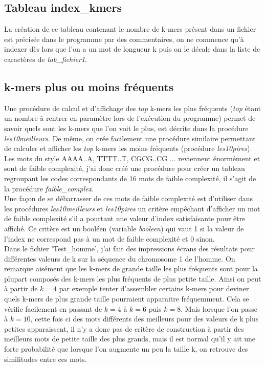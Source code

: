 \documentclass[10pt]{article}
\begin{document}
\subsection{Tableau index\_kmers}


La création de ce tableau contenant le nombre de k-mers présent dans un fichier est précisée dans le programme par des commentaires, on ne commence qu'à indexer dès lors que l'on a un mot de longueur k puis on le décale dans la liste de caractères de \textit{tab\_fichier1}.


\subsection{k-mers plus ou moins fréquents}


Une procédure de calcul et d'affichage des \textit{top} k-mers les plus fréquents (\textit{top} étant un nombre à rentrer en paramètre lors de l'exécution du programme) permet de savoir quels sont les k-mers que l'on voit le plus, est décrite dans la procédure \textit{les10meilleurs}. De même, on crée facilement une procédure similaire permettant de calculer et afficher les \textit{top} k-mers les moins fréquents (procédure \textit{les10pires}). \\

Les mots du style AAAA..A, TTTT..T, CGCG..CG ... reviennent énormément et sont de faible complexité, j'ai donc créé une procédure pour créer un tableau regroupant les codes correspondants de 16 mots de faible complexité, il s'agit de la procédure \textit{faible\_complex}. \\

Une façon de se débarrasser de ces mots de faible complexité est d'utiliser dans les procédures \textit{les10meilleurs} et \textit{les10pires} un critère empêchant d'afficher un mot de faible complexité s'il a pourtant une valeur d'index satisfaisante pour être affiché. Ce critère est un booléen (variable \textit{booleen}) qui vaut 1 si la valeur de l'index ne correspond pas à un mot de faible complexité et 0 sinon. \\

Dans le fichier 'Test\_homme', j'ai fait des impressions écrans des résultats pour différentes valeurs de k sur la séquence du chromosome 1 de l'homme. On remarque aisément que les k-mers de grande taille les plus fréquents sont pour la plupart composés des k-mers les plus fréquents de plus petite taille. Ainsi on peut à partir de $k = 4$ par exemple tenter d'assembler certains k-mers pour deviner quels k-mers de plus grande taille pourraient apparaitre fréquemment. Cela se vérifie facilement en passant de $k = 4$ à $k = 6$ puis $k = 8$. Mais lorsque l'on passe à $k = 10$, cette fois ci des mots différents des meilleurs pour des valeurs de k plus petites apparaissent, il n'y a donc pas de critère de construction à partir des meilleurs mots de petite taille des plus grands, mais il est normal qu'il y ait une forte probabilité que lorsque l'on augmente un peu la taille k, on retrouve des similitudes entre ces mots. \\
\end{document}
